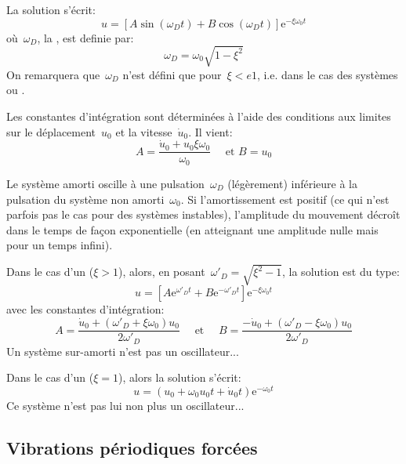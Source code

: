 La solution s'écrit: \begin{equation} u=\left[A\sin (\omega_D t)+B\cos(\omega_D t)\right] \mathrm{e}^{-\xi\omega_0t} \end{equation}
où~$\omega_D$, la , est definie par:
\begin{equation}\omega_D=\omega_0\sqrt{1-\xi^2}\end{equation}
On remarquera que~$\omega_D$ n'est défini que pour~$\xi<e1$, i.e.
dans le cas des systèmes  ou .

Les constantes d'intégration sont déterminées à l'aide des conditions aux limites sur le déplacement~$u_0$ et la
vitesse~$\dot{u}_0$. Il vient: \begin{equation} A=\dfrac{\dot{u}_0+u_0\xi\omega_0}{\omega_0} \quad \text{ et } B=u_0\end{equation}

Le système amorti oscille à une pulsation~$\omega_D$ (légèrement) inférieure à la pulsation du
système non amorti~$\omega_0$. Si l'amortissement est positif (ce qui n’est parfois pas le cas
pour des systèmes instables), l'amplitude du mouvement décroît dans le temps de façon
exponentielle (en atteignant une amplitude nulle mais pour un temps infini).

\medskip
Dans le cas d'un  ($\xi>1$), alors, en posant~$\omega'_D=\sqrt{\xi^2-1}$, la solution est du type:
\begin{equation} u=\left[A\mathrm{e}^{\omega'_D t}+B\mathrm{e}^{-\omega'_D t}\right] \mathrm{e}^{-\xi\omega_0t} \end{equation}
avec les constantes d'intégration:
\begin{equation}A=\dfrac{\dot{u}_0+(\omega'_D+\xi\omega_0)u_0}{2\omega'_D} \quad \text{ et }\quad
B=\dfrac{-\dot{u}_0+(\omega'_D-\xi\omega_0)u_0}{2\omega'_D} \end{equation}
Un système sur-amorti n'est pas un oscillateur...

\medskip
Dans le cas d'un  ($\xi=1$), alors la solution s'écrit:
\begin{equation}
u = (u_0+\omega_0u_0t+\dot{u}_0t)\mathrm{e}^{-\omega_0 t}
\end{equation}
Ce système n'est pas lui non plus un oscillateur...




\medskip{}
\subsection{Vibrations périodiques forcées}

